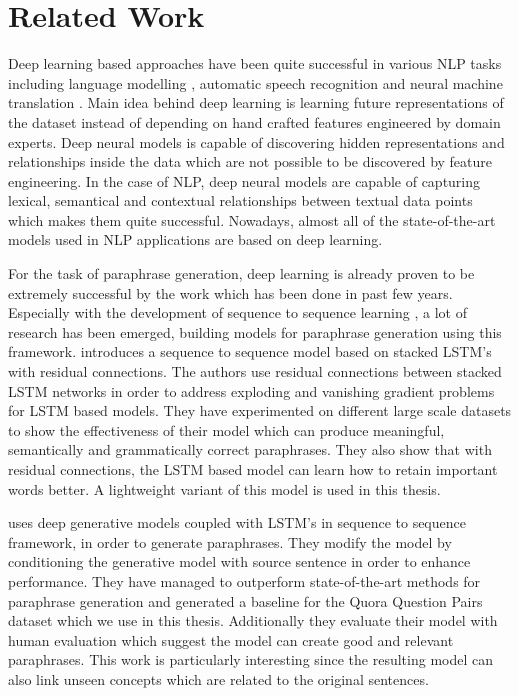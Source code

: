 \section{Related Work}

Deep learning based approaches have been quite successful in various NLP tasks including language modelling \cite{siriam}, automatic speech recognition \cite{hannun} and neural machine translation \cite{cho}. Main idea behind deep learning is learning future representations of the dataset instead of depending on hand crafted features engineered by domain experts. Deep neural models is capable of discovering hidden representations and relationships inside the data which are not possible to be discovered by feature engineering. In the case of NLP, deep neural models are capable of capturing lexical, semantical and contextual relationships between textual data points which makes them quite successful. Nowadays, almost all of the state-of-the-art models used in NLP applications are based on deep learning.

For the task of paraphrase generation, deep learning is already proven to be extremely successful by the work which has been done in past few years. Especially with the development of sequence to sequence learning \cite{Vinyalsetal}, a lot of research has been emerged, building models for paraphrase generation using this framework. \cite{Prakashetal} introduces a sequence to sequence model based on stacked LSTM's with residual connections. The authors use residual connections between stacked LSTM networks in order to address exploding and vanishing gradient problems for LSTM based models. They have experimented on different large scale datasets to show the effectiveness of their model which can produce meaningful, semantically and grammatically correct paraphrases. They also show that with residual connections, the LSTM based model can learn how to retain important words better. A lightweight variant of this model is used in this thesis.

\cite{Guptaetal} uses deep generative models coupled with LSTM's in sequence to sequence framework, in order to generate paraphrases. They modify the model by conditioning the generative model with source sentence in order to enhance performance. They have managed to outperform state-of-the-art methods for paraphrase generation and generated a baseline for the Quora Question Pairs dataset which we use in this thesis. Additionally they evaluate their model with human evaluation which suggest the model can create good and relevant paraphrases. This work is particularly interesting since the resulting model can also link unseen concepts which are related to the original sentences.

